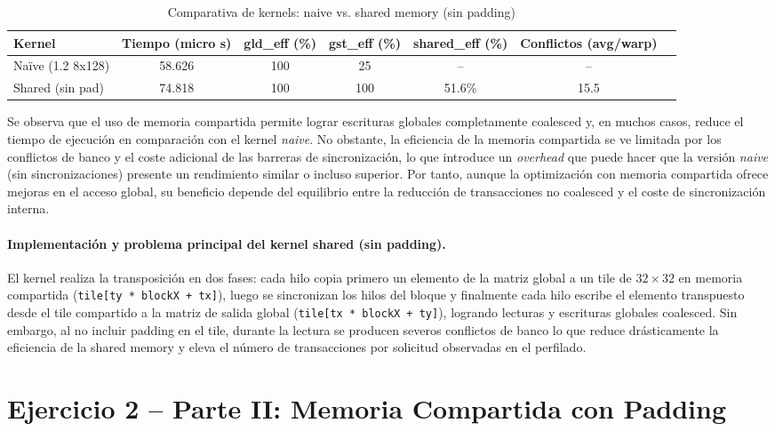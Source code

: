 \documentclass[a4paper,11pt]{article}
\begin{document}
\begin{table}[H]
\centering
\caption{Comparativa de kernels: naive vs. shared memory (sin padding)}
\begin{tabular}{lcccccc}
\toprule
Kernel & Tiempo (micro s) & gld\_eff (\%) & gst\_eff (\%) & shared\_eff (\%) & Conflictos (avg/warp) \\
\midrule
Naïve (1.2 8x128) & 58.626 & 100 & 25 & -- & -- \\ 
Shared (sin pad) & 74.818 & 100 & 100 & 51.6\% & 15.5 \\
\bottomrule
\end{tabular}
\end{table}

Se observa que el uso de memoria compartida permite lograr escrituras globales completamente coalesced y, en muchos casos, reduce el tiempo de ejecución en comparación con el kernel \textit{naive}. No obstante, la eficiencia de la memoria compartida se ve limitada por los conflictos de banco y el coste adicional de las barreras de sincronización, lo que introduce un \emph{overhead} que puede hacer que la versión \textit{naive} (sin sincronizaciones) presente un rendimiento similar o incluso superior. Por tanto, aunque la optimización con memoria compartida ofrece mejoras en el acceso global, su beneficio depende del equilibrio entre la reducción de transacciones no coalesced y el coste de sincronización interna.


\paragraph{Implementación y problema principal del kernel shared (sin padding).}
El kernel realiza la transposición en dos fases: cada hilo copia primero un elemento de la matriz global a un tile de $32\times32$ en memoria compartida (\texttt{tile[ty * blockX + tx]}), luego se sincronizan los hilos del bloque y finalmente cada hilo escribe el elemento transpuesto desde el tile compartido a la matriz de salida global (\texttt{tile[tx * blockX + ty]}), logrando lecturas y escrituras globales coalesced. Sin embargo, al no incluir padding en el tile, durante la lectura se producen severos conflictos de banco lo que reduce drásticamente la eficiencia de la shared memory y eleva el número de transacciones por solicitud observadas en el perfilado.

\section{Ejercicio 2 – Parte II: Memoria Compartida con Padding}
\end{document}
